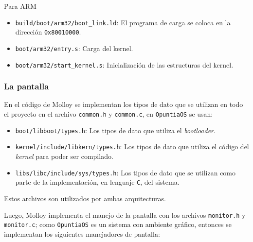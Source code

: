 		
		Para ARM
		\begin{itemize} \setlength\itemsep{0pt}
			\item \texttt{build/boot/arm32/boot\_link.ld}: El programa de carga se coloca en la dirección \texttt{0x80010000}.
			\item \texttt{boot/arm32/entry.s}: Carga del kernel.
			\item \texttt{boot/arm32/start\_kernel.s}: Inicialización de las estructuras del kernel.
		\end{itemize}
		
		
		
	
	\subsubsection{La pantalla}
		En el código de Molloy se implementan los tipos de dato que se utilizan en todo el proyecto en el archivo \texttt{common.h} y \texttt{common.c}, en \texttt{OpuntiaOS} se usan:
		\begin{itemize} \setlength\itemsep{0pt}
			\item \texttt{boot/libboot/types.h}: Los tipos de dato que utiliza el \textit{bootloader}.
			
			\item \texttt{kernel/include/libkern/types.h}: Los tipos de dato que utiliza el código del \textit{kernel} para poder ser compilado.
			
			\item \texttt{libs/libc/include/sys/types.h}: Los tipos de dato que se utilizan como parte de la implementación, en lenguaje \texttt{C}, del sistema.
		\end{itemize}
	
		Estos archivos son utilizados por ambas arquitecturas.
	
		
		
		Luego, Molloy implementa el manejo de la pantalla con los archivos \texttt{monitor.h} y \texttt{monitor.c}; como \texttt{OpuntiaOS} es un sistema con ambiente gráfico, entonces se implementan los siguientes manejadores de pantalla:
		
